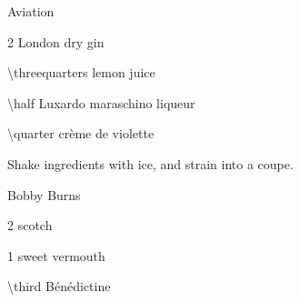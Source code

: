 \newcommand\PDTLogo{\textit{\raisebox{1ex}{P}\hspace{-0.27em}D\hspace{-0.17em}\raisebox{-1ex}{T}}}
\newenvironment{PDTCocktail}[1]
	{%
		\begin{Cocktail}[\Attribution{\PDTLogo}]{#1}
	}
	{%
		\end{Cocktail}
	}
\newcommand\PDTStarLogo{\textit{\raisebox{1ex}{P}\hspace{-0.27em}D\hspace{-0.17em}\raisebox{-1ex}{T}\,\raisebox{1ex}[0pt][0pt]{$^*$}}}
\newenvironment{PDTCocktail*}[1]
	{%
		\begin{Cocktail}[\Attribution{\PDTStarLogo}]{#1}
	}
	{%
		\end{Cocktail}
	}
\begin{PDTCocktail*}{Aviation} %
	\begin{Ingredients}
	\item \SI{2}{\oz} London dry gin
	\item \SI{\threequarters}{\oz} lemon juice
	\item \SI{\half}{\oz} Luxardo maraschino liqueur
	\item \SI{\quarter}{\oz} cr\`eme de violette
	\end{Ingredients}
	
	\begin{Instructions}
	Shake ingredients with ice, and strain into a coupe.
	\end{Instructions}
\end{PDTCocktail*}


\newcommand\JohnSquierLogo{\textit{\raisebox{1ex}{J}\hspace{-0.22em}S}}
\newenvironment{JSCocktail}[1]
	{%
		\begin{Cocktail}[\Attribution{\JohnSquierLogo}]{#1}
	}
	{%
		\end{Cocktail}
	}
\begin{JSCocktail}{Bobby Burns}
	\begin{Ingredients}
	\item \SI{2}{\oz} scotch %
	\item \SI{1}{\oz} sweet vermouth
	\item \SI{\third}{\oz} B\'en\'edictine
	\end{Ingredients}
\end{JSCocktail}

